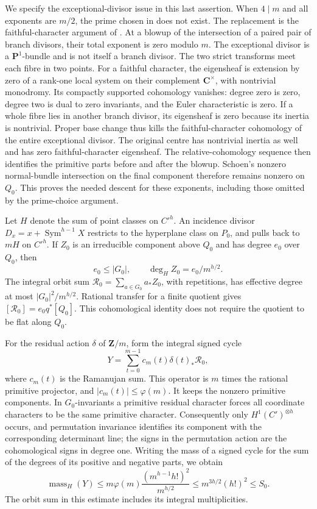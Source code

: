 \documentclass[11pt]{article}
\theoremstyle{definition}
\theoremstyle{remark}
\newcommand{\Z}{\mathbf Z}
\newcommand{\C}{\mathbf C}
\begin{document}
We specify the exceptional-divisor issue in this last assertion.
When $4\mid m$ and all exponents are $m/2$, the prime chosen in
\cite[Sublemma~2.9, p.~19]{Schoen88} does not exist. The replacement
is the faithful-character argument of \cite[Lemma~4.4, pp.~9--10]{Severn}.
At a blowup of the intersection of a paired pair of branch divisors,
their total exponent is zero modulo $m$. The exceptional divisor is a
$\mathbf P^1$-bundle and is not itself a branch divisor. The two
strict transforms meet each fibre in two points. For a faithful
character, the eigensheaf is extension by zero of a rank-one local
system on their complement $\C^\times$, with nontrivial monodromy.
Its compactly supported cohomology vanishes: degree zero is zero,
degree two is dual to zero invariants, and the Euler characteristic is
zero. If a whole fibre lies in another branch divisor, its eigensheaf
is zero because its inertia is nontrivial. Proper base change thus
kills the faithful-character cohomology of the entire exceptional
divisor. The original centre has nontrivial inertia as well and has
zero faithful-character eigensheaf. The relative-cohomology sequence
then identifies the primitive parts before and after the blowup.
Schoen's nonzero normal-bundle intersection on the final component
therefore remains nonzero on $Q_0$. This proves the needed descent for
these exponents, including those omitted by the prime-choice argument.

Let $H$ denote the sum of point classes on $C'^h$. An incidence divisor
$D_x=x+\operatorname{Sym}^{h-1}X$ restricts to the hyperplane class on
$P_0$, and pulls back to $mH$ on $C'^h$. If $Z_0$ is an irreducible
component above $Q_0$ and has degree $e_0$ over $Q_0$, then
\[
 e_0\le |G_0|,
 \qquad \deg_H Z_0=e_0/m^{h/2}.
\]
The integral orbit sum
$\mathcal R_0=\sum_{a\in G_0}a_*Z_0$, with repetitions, has effective
degree at most $|G_0|^2/m^{h/2}$. Rational transfer for a finite
quotient gives $[\mathcal R_0]=e_0q^*[Q_0]$. This cohomological
identity does not require the quotient to be flat along $Q_0$.

For the residual action $\delta$ of $\Z/m$, form the integral signed
cycle
\[
 Y=\sum_{t=0}^{m-1}c_m(t)\delta(t)_*\mathcal R_0,
\]
where $c_m(t)$ is the Ramanujan sum. This operator is $m$ times the
rational primitive projector, and $|c_m(t)|\le\varphi(m)$. It keeps
the nonzero primitive components. In $G_0$-invariants a primitive
residual character forces all coordinate characters to be the same
primitive character. Consequently only
$H^1(C')^{\otimes h}$ occurs, and permutation invariance identifies
its component with the corresponding determinant line; the signs in
the permutation action are the cohomological signs in degree one.
Writing the mass of a signed cycle for the sum of the degrees of its
positive and negative parts, we obtain
\begin{equation}\label{eq:eis-cyclic-mass}
 \operatorname{mass}_H(Y)
 \le m\varphi(m)\frac{(m^{h-1}h!)^2}{m^{h/2}}
 \le m^{3h/2}(h!)^2\le S_0.
\end{equation}
The orbit sum in this estimate includes its integral multiplicities.
\end{document}
